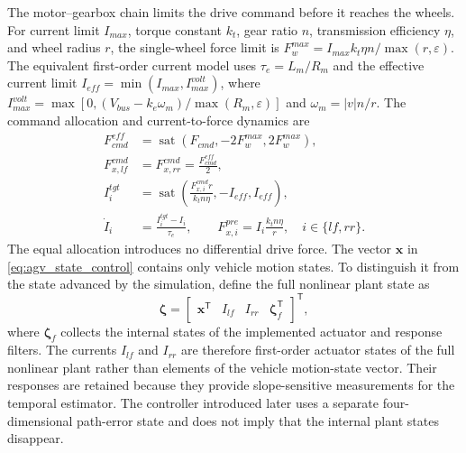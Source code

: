 \documentclass{ieeeaccess}
\begin{document}
The motor--gearbox chain limits the drive command before it reaches the wheels. For current limit $I_{max}$, torque constant $k_t$, gear ratio $n$, transmission efficiency $\eta$, and wheel radius $r$, the single-wheel force limit is $F_w^{max}=I_{max}k_t\eta n/\max(r,\varepsilon)$. The equivalent first-order current model uses $\tau_e=L_m/R_m$ and the effective current limit $I_{eff}=\min(I_{max},I_{max}^{volt})$, where $I_{max}^{volt}=\max[0,(V_{bus}-k_e\omega_m)/\max(R_m,\varepsilon)]$ and $\omega_m=|v|n/r$. The command allocation and current-to-force dynamics are
\begin{equation}
\begin{aligned}
F_{cmd}^{eff}&=\operatorname{sat}\!\left(F_{cmd},-2F_w^{max},2F_w^{max}\right),\\
F_{x,lf}^{cmd}&=F_{x,rr}^{cmd}=\frac{F_{cmd}^{eff}}{2},\\
I_i^{tgt}&=\operatorname{sat}\!\left(\frac{F_{x,i}^{cmd}r}{k_tn\eta},-I_{eff},I_{eff}\right),\\
\dot I_i&=\frac{I_i^{tgt}-I_i}{\tau_e},\qquad
F_{x,i}^{pre}=I_i\frac{k_tn\eta}{r},\quad i\in\{lf,rr\}.
\end{aligned}
\label{eq:agv_drive_actuation}
\end{equation}
The equal allocation introduces no differential drive force. The vector $\bm x$ in \eqref{eq:agv_state_control} contains only vehicle motion states. To distinguish it from the state advanced by the simulation, define the full nonlinear plant state as
\begin{equation}
\bm\zeta=
\begin{bmatrix}
\bm x^{\mathsf T}&I_{lf}&I_{rr}&\bm\zeta_f^{\mathsf T}
\end{bmatrix}^{\mathsf T},
\label{eq:full_nonlinear_state}
\end{equation}
where $\bm\zeta_f$ collects the internal states of the implemented actuator and response filters. The currents $I_{lf}$ and $I_{rr}$ are therefore first-order actuator states of the full nonlinear plant rather than elements of the vehicle motion-state vector. Their responses are retained because they provide slope-sensitive measurements for the temporal estimator. The controller introduced later uses a separate four-dimensional path-error state and does not imply that the internal plant states disappear.
\end{document}
